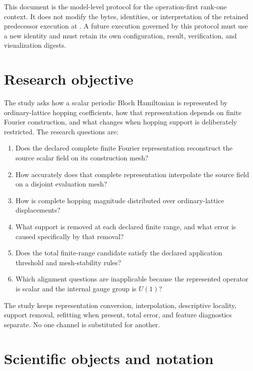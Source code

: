 \documentclass[11pt]{article}
\begin{document}
This document is the model-level protocol for the operation-first rank-one context.  It
does not modify the bytes, identities, or interpretation of the retained predecessor
execution at
.
A future execution governed by this protocol must use a new identity and must retain its
own configuration, result, verification, and visualization digests.

\section{Research objective}

The study asks how a scalar periodic Bloch Hamiltonian is represented by
ordinary-lattice hopping coefficients, how that representation depends on finite Fourier
construction, and what changes when hopping support is deliberately restricted.  The
research questions are:

\begin{enumerate}[leftmargin=*]
  \item Does the declared complete finite Fourier representation reconstruct the source
    scalar field on its construction mesh?
  \item How accurately does that complete representation interpolate the source field on
    a disjoint evaluation mesh?
  \item How is complete hopping magnitude distributed over ordinary-lattice
    displacements?
  \item What support is removed at each declared finite range, and what error is caused
    specifically by that removal?
  \item Does the total finite-range candidate satisfy the declared application threshold
    and mesh-stability rules?
  \item Which alignment questions are inapplicable because the represented operator is
    scalar and the internal gauge group is $U(1)$?
\end{enumerate}

The study keeps representation conversion, interpolation, descriptive locality,
support removal, refitting when present, total error, and feature diagnostics separate.
No one channel is substituted for another.

\section{Scientific objects and notation}
\end{document}
